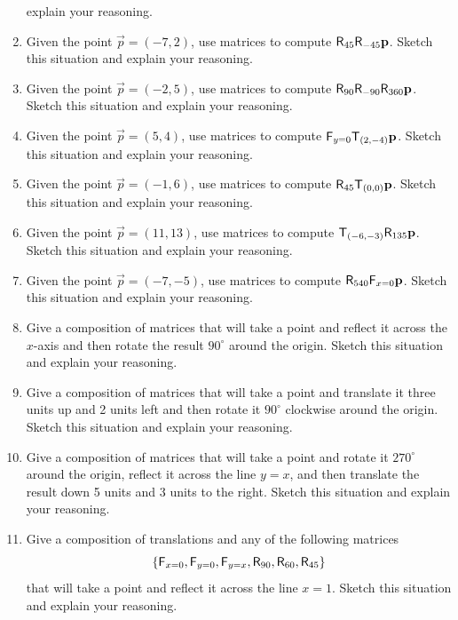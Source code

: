 \begin{enumerate}
  explain your reasoning.
\item Given the point $\vec{p}=(-7,2)$, use matrices to compute
  $\mathsf{R}_{45}\mathsf{R}_{-45}\mathbf{p}$.  Sketch this situation and
  explain your reasoning.
\item Given the point $\vec{p}=(-2,5)$, use matrices to compute
  $\mathsf{R}_{90}\mathsf{R}_{-90}\mathsf{R}_{360}\mathbf{p}$.  Sketch this
  situation and explain your reasoning.
\item Given the point $\vec{p}=(5,4)$, use matrices to compute
  $\mathsf{F}_{y=0}\mathsf{T}_{(2,-4)}\mathbf{p}$.  Sketch this
  situation and explain your reasoning.
\item Given the point $\vec{p}=(-1,6)$, use matrices to compute
  $\mathsf{R}_{45}\mathsf{T}_{(0,0)}\mathbf{p}$.  Sketch this situation and
  explain your reasoning.
\item Given the point $\vec{p}=(11,13)$, use matrices to  compute
  $\mathsf{T}_{(-6,-3)}\mathsf{R}_{135}\mathbf{p}$.  Sketch this situation and
  explain your reasoning.
\item Given the point $\vec{p}=(-7,-5)$, use matrices to compute
  $\mathsf{R}_{540}\mathsf{F}_{x=0}\mathbf{p}$.  Sketch this situation and
  explain your reasoning.



\item Give a composition of matrices that will take a
  point and reflect it across the $x$-axis and then rotate the result
  $90^\circ$ around the origin. Sketch this situation and
  explain your reasoning.

\item Give a composition of matrices that will take a
  point and translate it three units up and 2 units left and then
  rotate it $90^\circ$ clockwise around the origin. Sketch this situation and
  explain your reasoning.

\item Give a composition of matrices that will take a
  point and rotate it $270^\circ$ around the origin, reflect it across
  the line $y=x$, and then translate the result down 5 units and 3
  units to the right. Sketch this situation and
  explain your reasoning.

\item Give a composition of translations and any of the following matrices
\[
\{\mathsf{F}_{x=0},\mathsf{F}_{y=0}, \mathsf{F}_{y=x}, \mathsf{R}_{90},\mathsf{R}_{60},\mathsf{R}_{45}\}
\]
that will take a point and reflect it across the line $x=1$. Sketch
this situation and explain your reasoning.


\end{enumerate}
